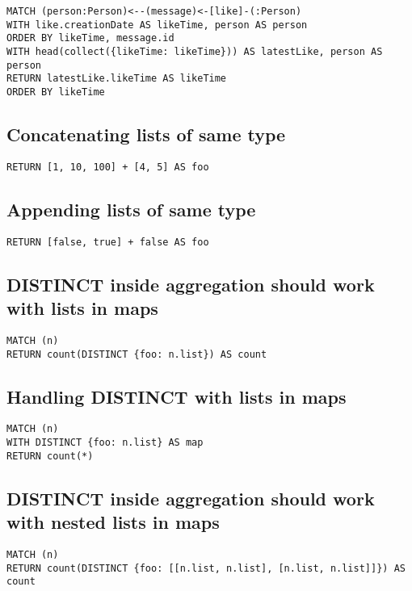 \begin{lstlisting}
MATCH (person:Person)<--(message)<-[like]-(:Person)
WITH like.creationDate AS likeTime, person AS person
ORDER BY likeTime, message.id
WITH head(collect({likeTime: likeTime})) AS latestLike, person AS person
RETURN latestLike.likeTime AS likeTime
ORDER BY likeTime
\end{lstlisting}

\subsection{Concatenating lists of same type}

\begin{lstlisting}
RETURN [1, 10, 100] + [4, 5] AS foo
\end{lstlisting}

\subsection{Appending lists of same type}

\begin{lstlisting}
RETURN [false, true] + false AS foo
\end{lstlisting}

\subsection{DISTINCT inside aggregation should work with lists in maps}

\begin{lstlisting}
MATCH (n)
RETURN count(DISTINCT {foo: n.list}) AS count
\end{lstlisting}

\subsection{Handling DISTINCT with lists in maps}

\begin{lstlisting}
MATCH (n)
WITH DISTINCT {foo: n.list} AS map
RETURN count(*)
\end{lstlisting}

\subsection{DISTINCT inside aggregation should work with nested lists in maps}

\begin{lstlisting}
MATCH (n)
RETURN count(DISTINCT {foo: [[n.list, n.list], [n.list, n.list]]}) AS count
\end{lstlisting}

